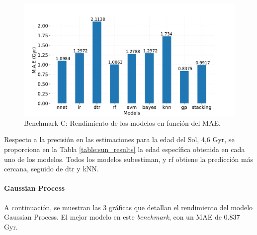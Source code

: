 \begin{figure}[H]
\begin{center}
 \includegraphics[width=0.8\linewidth]{Figuras/Experimentos/B_C_models.pdf}
\end{center}
\caption{Benchmark C: Rendimiento de los modelos en función del MAE.}
 \label{fig:benchC}
\end{figure}

Respecto a la precisión en las estimaciones para la edad del Sol, 4,6 Gyr, se proporciona en la Tabla \ref{table:sun_results} la edad específica obtenida en cada uno de los modelos. Todos los modelos subestiman, y rf obtiene la predicción más cercana, seguido de dtr y kNN.


\begin{table}[H]
\centering
{}%
\caption{Edad estimada para el Sol en Gyr. El método más preciso es rf. }\label{table:sun_results}
\end{table}

\paragraph{Gaussian Process} 
A continuación, se muestran las 3 gráficas que detallan el rendimiento del modelo Gaussian Process. El mejor modelo en este \emph{benchmark}, con un MAE de 0.837 Gyr.

